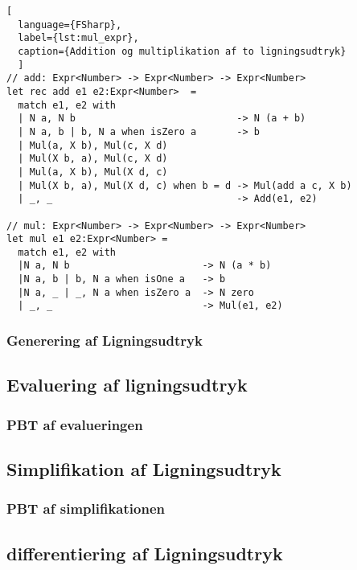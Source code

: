 \documentclass{article}
\begin{document}
\begin{lstlisting}[
  language={FSharp}, 
  label={lst:mul_expr}, 
  caption={Addition og multiplikation af to ligningsudtryk}
  ]
// add: Expr<Number> -> Expr<Number> -> Expr<Number>
let rec add e1 e2:Expr<Number>  =
  match e1, e2 with
  | N a, N b                            -> N (a + b)
  | N a, b | b, N a when isZero a       -> b
  | Mul(a, X b), Mul(c, X d) 
  | Mul(X b, a), Mul(c, X d)
  | Mul(a, X b), Mul(X d, c) 
  | Mul(X b, a), Mul(X d, c) when b = d -> Mul(add a c, X b)  
  | _, _                                -> Add(e1, e2)

// mul: Expr<Number> -> Expr<Number> -> Expr<Number>
let mul e1 e2:Expr<Number> =
  match e1, e2 with
  |N a, N b                       -> N (a * b)
  |N a, b | b, N a when isOne a   -> b
  |N a, _ | _, N a when isZero a  -> N zero
  | _, _                          -> Mul(e1, e2)
\end{lstlisting}


\subsubsection{Generering af Ligningsudtryk}\label{sec:expression_generation}
    
\subsection{Evaluering af ligningsudtryk}
\subsubsection{PBT af evalueringen} %
\subsection{Simplifikation af Ligningsudtryk} \label{sec:simplification_expression}
\subsubsection{PBT af simplifikationen} %

\subsection{differentiering af Ligningsudtryk}
    
\end{document}
